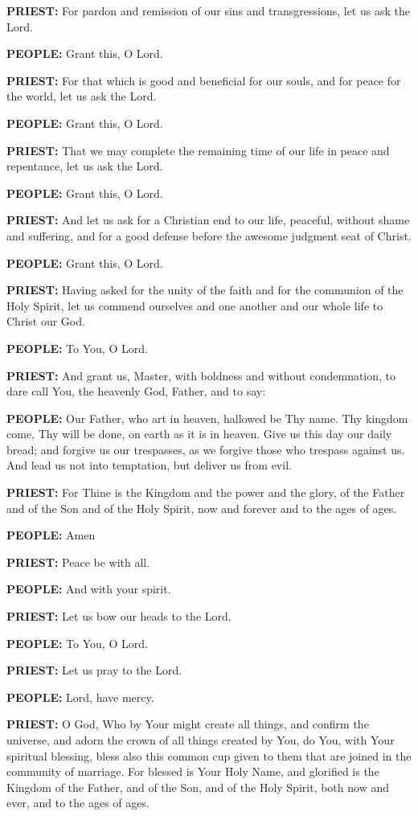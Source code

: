 \textbf{PRIEST:} For pardon and remission of our sins and
transgressions, let us ask the Lord.

\textbf{PEOPLE:} Grant this, O Lord.

\textbf{PRIEST:} For that which is good and beneficial for our souls,
and for peace for the world, let us ask the Lord.

\textbf{PEOPLE:} Grant this, O Lord.

\textbf{PRIEST:} That we may complete the remaining time of our life in
peace and repentance, let us ask the Lord.

\textbf{PEOPLE:} Grant this, O Lord.

\textbf{PRIEST:} And let us ask for a Christian end to our life,
peaceful, without shame and suffering, and for a good defense before the
awesome judgment seat of Christ.

\textbf{PEOPLE:} Grant this, O Lord.

\textbf{PRIEST:} Having asked for the unity of the faith and for the
communion of the Holy Spirit, let us commend ourselves and one another
and our whole life to Christ our God.

\textbf{PEOPLE:} To You, O Lord.

\textbf{PRIEST:} And grant us, Master, with boldness and without
condemnation, to dare call You, the heavenly God, Father, and to say:

\textbf{PEOPLE:} Our Father, who art in heaven, hallowed be Thy name.
Thy kingdom come, Thy will be done, on earth as it is in heaven. Give us
this day our daily bread; and forgive us our trespasses, as we forgive
those who trespass against us. And lead us not into temptation, but
deliver us from evil.

\textbf{PRIEST:} For Thine is the Kingdom and the power and the glory,
of the Father and of the Son and of the Holy Spirit, now and forever and
to the ages of ages.

\textbf{PEOPLE:} Amen

\textbf{PRIEST:} Peace be with all.

\textbf{PEOPLE:} And with your spirit.

\textbf{PRIEST:} Let us bow our heads to the Lord.

\textbf{PEOPLE:} To You, O Lord.

\textbf{PRIEST:} Let us pray to the Lord.

\textbf{PEOPLE:} Lord, have mercy.

\textbf{PRIEST:} O God, Who by Your might create all things, and confirm
the universe, and adorn the crown of all things created by You, do You,
with Your spiritual blessing, bless also this common cup given to them
that are joined in the community of marriage. For blessed is Your Holy
Name, and glorified is the Kingdom of the Father, and of the Son, and of
the Holy Spirit, both now and ever, and to the ages of ages.

